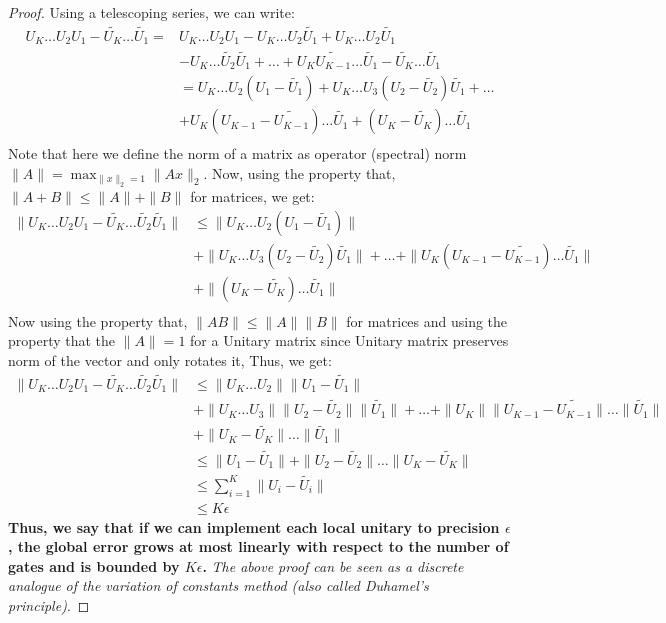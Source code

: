 \documentclass[12pt, oneside]{book}
\theoremstyle{definition}
\theoremstyle{definition}
\theoremstyle{remark}
\begin{document}
\begin{proof}
    Using a telescoping series, we can write:
    \begin{align*}
        U_K\ldots U_2U_1 - \tilde{U_K}\ldots \tilde{U_1} = & U_K\ldots U_2U_1-U_K\ldots U_2 \tilde{U_1} + U_K\ldots U_2\tilde{U_1} \\
        & - U_K \ldots \tilde{U_2}\tilde{U_1}+\ldots+U_K\tilde{U_{K-1}}\ldots \tilde{U_1}-\tilde{U_K}\ldots \tilde{U_1} \\
        &= U_K\ldots U_2(U_1-\tilde{U_1}) + U_K\ldots U_3(U_2-\tilde{U_2})\tilde{U_1} + \ldots \\
        & + U_K(U_{K-1}-\tilde{U_{K-1}})\ldots \tilde{U_1} + (U_K-\tilde{U_K})\ldots \tilde{U_1} \\
    \end{align*}
    Note that here we define the norm of a matrix as operator (spectral) norm $\|A\|=\max_{\|x\|_2=1}\|Ax\|_2$.
    Now, using the property that, $\|A+B\| \leq \|A\|+\|B\|$ for matrices, we get:
    \begin{align*}
        \|U_K\ldots U_2U_1-\tilde{U_K}\ldots \tilde{U_2}\tilde{U_1}\| & \leq \|U_K\ldots U_2(U_1-\tilde{U_1})\| \\
        & + \|U_K\ldots U_3(U_2-\tilde{U_2})\tilde{U_1}\| + \ldots + \|U_K(U_{K-1}-\tilde{U_{K-1}})\ldots \tilde{U_1}\| \\
        & + \|(U_K-\tilde{U_K})\ldots \tilde{U_1}\| \\
    \end{align*}
    Now using the property that, $\|AB\| \leq \|A\|\|B\|$ for matrices and using the property that the $\|A\|=1$ for a Unitary matrix since Unitary matrix preserves norm
    of the vector and only rotates it, Thus, we get:
    \begin{align*}
        \|U_K\ldots U_2U_1-\tilde{U_K}\ldots \tilde{U_2}\tilde{U_1}\| & \leq \|U_K\ldots U_2\|\|U_1-\tilde{U_1}\| \\
        & + \|U_K\ldots U_3\|\|U_2-\tilde{U_2}\|\|\tilde{U_1}\| + \ldots + \|U_K\|\|U_{K-1}-\tilde{U_{K-1}}\|\ldots \|\tilde{U_1}\| \\
        & + \|U_K-\tilde{U_K}\|\ldots \|\tilde{U_1}\| \\
        &\leq\|U_1-\tilde{U_1}\|+\|U_2-\tilde{U_2}\|\ldots \|U_K-\tilde{U_K}\| \\
        & \leq \sum_{i=1}^K\|U_i-\tilde{U_i}\| \\
        & \leq K\epsilon
    \end{align*}
    \textbf{Thus, we say that if we can implement each local unitary to precision $\epsilon$, the global error grows at most linearly with
    respect to the number of gates and is bounded by $K\epsilon$.}
    \textit{The above proof can be seen as a discrete analogue of the variation of constants method (also called Duhamel's principle)}.
\end{proof}
 
\end{document}
